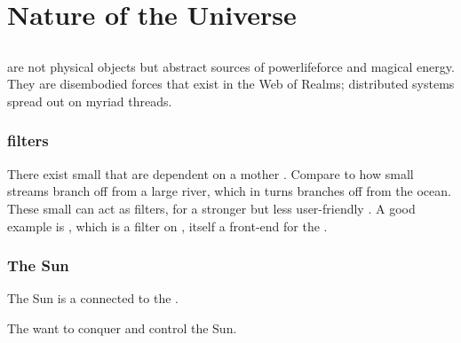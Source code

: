 
\chapter{Nature of the Universe}
\section{\Dweomers}
\Dweomers{} are not physical objects but abstract sources of power\dash lifeforce and magical energy. 
They are disembodied forces that exist in the Web of Realms; distributed systems spread out on myriad threads. 








\subsection{\Dweomer{} filters}
There exist small \dweomers{} that are dependent on a mother \dweomer. 
Compare to how small streams branch off from a large river, which in turns branches off from the ocean. 
These small \dweomers{} can act as filters,  for a stronger but less user-friendly \dweomer. 
A good example is \iquin, which is a filter on \itzach, itself a front-end for the . 









\subsection{The Sun}
The Sun is a \dweomer{} connected to the . 

The \banes{} want to conquer and control the Sun. 










